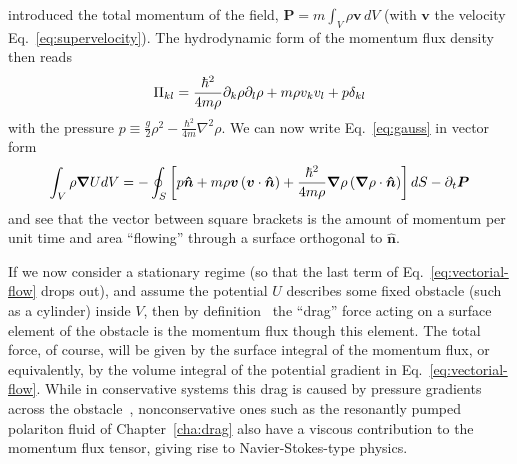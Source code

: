 \begin{subappendices}
introduced the total momentum of the field,
$\bm{P} = m \int_{V} \rho \bm{v}\, dV$ (with $\bm{v}$ the velocity
Eq.~\eqref{eq:supervelocity}). The hydrodynamic form of the momentum
flux density then reads
%
\begin{equation}\label{eq:pressure}
  \Pi_{k l} = \frac{\hbar^2}{4m\rho} \partial_k\rho \partial_l\rho + m\rho v_k v_l + p\delta_{k l}
\end{equation}
% 
with the pressure
$p \equiv \frac{g}{2}\rho^2 - \frac{\hbar^2}{4m} \nabla^2 \rho$. We
can now write Eq.~\eqref{eq:gauss} in vector form
%
\begin{equation}\label{eq:vectorial-flow}
  \int_{V}  \rho \bm{\nabla} U dV = - \oint_S \left[ p \bm{\hat{n}} + m\rho \bm{v} \left(\bm{v} \cdot \bm{\hat{n}}\right) + \frac{\hbar^2}{4m\rho}\bm{\nabla}\rho \left(\bm{\nabla}\rho \cdot \bm{\hat{n}}\right)  \right] d S - \partial_t \bm{P}
\end{equation}
% 
and see that the vector between square brackets is the amount of
momentum per unit time and area ``flowing'' through a surface
orthogonal to $\bm{\hat{n}}$.

If we now consider a stationary regime (so that the last term of
Eq.~\eqref{eq:vectorial-flow} drops out), and assume the potential $U$
describes some fixed obstacle (such as a cylinder) inside $V$, then by
definition~\cite{Landau:111625} the ``drag'' force acting on a surface
element of the obstacle is the momentum flux though this element. The
total force, of course, will be given by the surface integral of the
momentum flux, or equivalently, by the volume integral of the
potential gradient in Eq.~\eqref{eq:vectorial-flow}. While in
conservative systems this drag is caused by pressure gradients across
the obstacle~\cite{PhysRevLett.82.5186}, nonconservative ones such as
the resonantly pumped polariton fluid of Chapter~\ref{cha:drag} also
have a viscous contribution to the momentum flux tensor, giving rise
to Navier-Stokes-type physics.

\end{subappendices}


